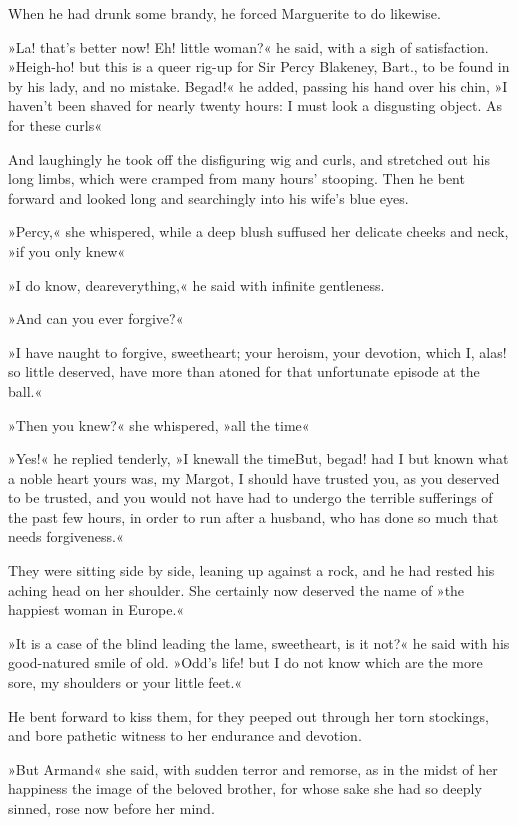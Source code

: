 When he had drunk some brandy, he forced Marguerite to do likewise.

»La! that's better now! Eh! little woman?« he said, with a sigh of satisfaction. »Heigh-ho! but this is a queer rig-up for Sir Percy Blakeney, Bart., to be found in by his lady, and no mistake. Begad!« he added, passing his hand over his chin, »I haven't been shaved for nearly twenty hours: I must look a disgusting object. As for these curls\textellipsis«

And laughingly he took off the disfiguring wig and curls, and stretched out his long limbs, which were cramped from many hours' stooping. Then he bent forward and looked long and searchingly into his wife's blue eyes.

»Percy,« she whispered, while a deep blush suffused her delicate cheeks and neck, »if you only knew\textellipsis«

»I do know, dear\textellipsis \allowbreak  everything,« he said with infinite gentleness.

»And can you ever forgive?«

»I have naught to forgive, sweetheart; your heroism, your devotion, which I, alas! so little deserved, have more than atoned for that unfortunate episode at the ball.«

»Then you knew?\textellipsis« she whispered, »all the time\textellipsis«

»Yes!« he replied tenderly, »I knew\textellipsis \allowbreak  all the time\textellipsis \allowbreak  But, begad! had I but known what a noble heart yours was, my Margot, I should have trusted you, as you deserved to be trusted, and you would not have had to undergo the terrible sufferings of the past few hours, in order to run after a husband, who has done so much that needs forgiveness.«

They were sitting side by side, leaning up against a rock, and he had rested his aching head on her shoulder. She certainly now deserved the name of »the happiest woman in Europe.«

»It is a case of the blind leading the lame, sweetheart, is it not?« he said with his good-natured smile of old. »Odd's life! but I do not know which are the more sore, my shoulders or your little feet.«

He bent forward to kiss them, for they peeped out through her torn stockings, and bore pathetic witness to her endurance and devotion.

»But Armand\textellipsis« she said, with sudden terror and remorse, as in the midst of her happiness the image of the beloved brother, for whose sake she had so deeply sinned, rose now before her mind.


